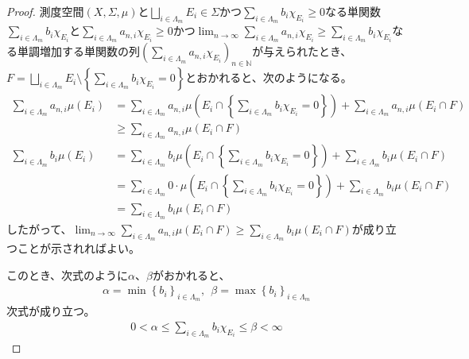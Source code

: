 \documentclass[dvipdfmx]{jsarticle}
\begin{document}
\begin{proof}
測度空間$(X,\varSigma,\mu)$と$\bigsqcup_{i \in \varLambda_{m}} E_{i} \in \varSigma$かつ$\sum_{i \in \varLambda_{m}} {b_{i}\chi_{E_{i}}} \geq 0$なる単関数$\sum_{i \in \varLambda_{m}} {b_{i}\chi_{E_{i}}}$と$\sum_{i \in \varLambda_{m}} {a_{n,i}\chi_{E_{i}}} \geq 0$かつ$\lim_{n \rightarrow \infty}{\sum_{i \in \varLambda_{m}} {a_{n,i}\chi_{E_{i}}}} \geq \sum_{i \in \varLambda_{m}} {b_{i}\chi_{E_{i}}}$なる単調増加する単関数の列$\left( \sum_{i \in \varLambda_{m}} {a_{n,i}\chi_{E_{i}}} \right)_{n \in \mathbb{N}}$が与えられたとき、$F = \bigsqcup_{i \in \varLambda_{m}} E_{i} \setminus \left\{ \sum_{i \in \varLambda_{m}} {b_{i}\chi_{E_{i}}} = 0 \right\}$とおかれると、次のようになる。
\begin{align*}
\sum_{i \in \varLambda_{m}} {a_{n,i}\mu\left( E_{i} \right)} &= \sum_{i \in \varLambda_{m}} {a_{n,i}\mu\left( E_{i} \cap \left\{ \sum_{i \in \varLambda_{m}} {b_{i}\chi_{E_{i}}} = 0 \right\} \right)} + \sum_{i \in \varLambda_{m}} {a_{n,i}\mu\left( E_{i} \cap F \right)}\\
&\geq \sum_{i \in \varLambda_{m}} {a_{n,i}\mu\left( E_{i} \cap F \right)}\\
\sum_{i \in \varLambda_{m}} {b_{i}\mu\left( E_{i} \right)} &= \sum_{i \in \varLambda_{m}} {b_{i}\mu\left( E_{i} \cap \left\{ \sum_{i \in \varLambda_{m}} {b_{i}\chi_{E_{i}}} = 0 \right\} \right)} + \sum_{i \in \varLambda_{m}} {b_{i}\mu\left( E_{i} \cap F \right)}\\
&= \sum_{i \in \varLambda_{m}} {0 \cdot \mu\left( E_{i} \cap \left\{ \sum_{i \in \varLambda_{m}} {b_{i}\chi_{E_{i}}} = 0 \right\} \right)} + \sum_{i \in \varLambda_{m}} {b_{i}\mu\left( E_{i} \cap F \right)}\\
&= \sum_{i \in \varLambda_{m}} {b_{i}\mu\left( E_{i} \cap F \right)}
\end{align*}
したがって、$\lim_{n \rightarrow \infty}{\sum_{i \in \varLambda_{m}} {a_{n,i}\mu\left( E_{i} \cap F \right)}} \geq \sum_{i \in \varLambda_{m}} {b_{i}\mu\left( E_{i} \cap F \right)}$が成り立つことが示されればよい。\par
このとき、次式のように$\alpha$、$\beta$がおかれると、
\begin{align*}
\alpha = \min\left\{ b_{i} \right\}_{i \in \varLambda_{m}},\ \ \beta = \max\left\{ b_{i} \right\}_{i \in \varLambda_{m}}
\end{align*}
次式が成り立つ。
\begin{align*}
0 < \alpha \leq \sum_{i \in \varLambda_{m}} {b_{i}\chi_{E_{i}}} \leq \beta < \infty
\end{align*}

\end{proof}
\end{document}

